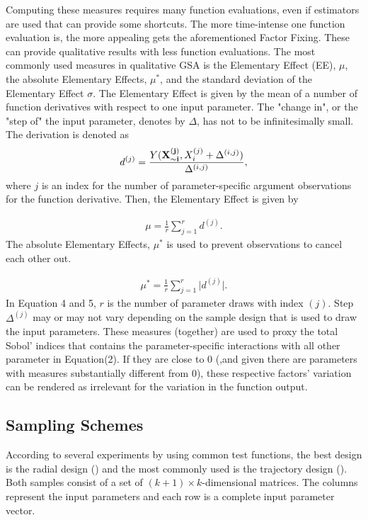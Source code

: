\documentclass[a4paper,12pt]{article}
\begin{document}
Computing these measures requires many function evaluations, even if estimators are used that can provide some shortcuts. The more time-intense one function evaluation is, the more appealing gets the aforementioned Factor Fixing. These can provide qualitative results with less function evaluations.
The most commonly used measures in qualitative GSA is the Elementary Effect (EE), $\mu$, the absolute Elementary Effects, $\mu^*$, and the standard deviation of the Elementary Effect $\sigma$. The Elementary Effect is given by the mean of a number of function derivatives with respect to one input parameter. The "change in", or the "step of" the input parameter, denotes by $\Delta$, has not to be infinitesimally small. The derivation is denoted as
\begin{align}
d^{(j)} =  \frac{Y(\bold{X_{\sim i}^{(j)}}, X_i^{(j)} + \Delta^{(i,j)})}{\Delta^{(i,j)}},
\end{align}
where $j$ is an index for the number of parameter-specific argument observations for the function derivative.
Then, the Elementary Effect is given by

\begin{align}
\mu = \frac{1}{r} \sum_{j=1}^{r} d^{(j)}.
\end{align}
\noindent
The absolute Elementary Effects, $\mu^*$ is used to prevent observations to cancel each other out.

\begin{align}
\mu^* = \frac{1}{r} \sum_{j=1}^{r} \big| d^{(j)} \big|.
\end{align}
\noindent
In Equation 4 and 5, $r$ is the number of parameter draws with index $(j)$. Step $\Delta^{(j)}$ may or may not vary depending on the sample design that is used to draw the input parameters. These measures (together) are used to proxy the total Sobol' indices that contains the parameter-specific interactions with all other parameter in Equation(2). If they are close to 0 (,and given there are parameters with measures substantially different from 0), these respective factors' variation can be rendered as irrelevant for the variation in the function output.

\subsection{Sampling Schemes}

According to several experiments by \cite{campolongo2011screening} using common test functions, the best design is the radial design (\cite{saltelli2002making}) and the most commonly used is the trajectory design (\cite{Morris.1991}).
Both samples consist of a set of $(k + 1) \times k$-dimensional matrices. The columns represent the input parameters and each row is a complete input parameter vector.\\
\end{document}
